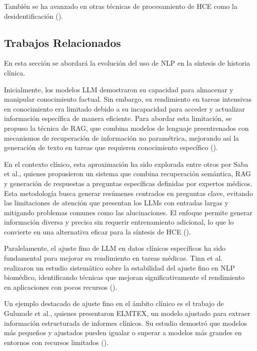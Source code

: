 \documentclass[../main.tex]{subfiles}
\begin{document}
También se ha avanzado en otras técnicas de procesamiento de HCE como la desidentificación (\cite{MORENOBAREA2025109576}).

\subsection{Trabajos Relacionados}

En esta sección se abordará la evolución del uso de NLP en la síntesis de historia clínica.

Inicialmente, los modelos LLM demostraron su capacidad para almacenar y manipular conocimiento factual. Sin embargo, su rendimiento en tareas intensivas en conocimiento era limitado debido a su incapacidad para acceder y actualizar información específica de manera eficiente. Para abordar esta limitación, se propuso la técnica de RAG, que combina modelos de lenguaje preentrenados con mecanismos de recuperación de información no paramétrica, mejorando así la generación de texto en tareas que requieren conocimiento específico (\cite{lewis2021retrievalaugmentedgenerationknowledgeintensivenlp}).

En el contexto clínico, esta aproximación ha sido explorada entre otros por Saba et al., quienes propusieron un sistema que combina recuperación semántica, RAG y generación de respuestas a preguntas específicas definidas por expertos médicos. Esta metodología busca generar resúmenes centrados en preguntas clave, evitando las limitaciones de atención que presentan los LLMs con entradas largas y mitigando problemas comunes como las alucinaciones. El enfoque permite generar información diversa y precisa sin requerir entrenamiento adicional, lo que lo convierte en una alternativa eficaz para la síntesis de HCE (\cite{saba2024questionansweringbasedsummarizationelectronic}).

Paralelamente, el ajuste fino de LLM en datos clínicos específicos ha sido fundamental para mejorar su rendimiento en tareas médicas. Tinn et al. realizaron un estudio sistemático sobre la estabilidad del ajuste fino en NLP biomédico, identificando técnicas que mejoran significativamente el rendimiento en aplicaciones con pocos recursos (\cite{TINN2023100729}).

Un ejemplo destacado de ajuste fino en el ámbito clínico es el trabajo de Guluzade et al., quienes presentaron ELMTEX, un modelo ajustado para extraer información estructurada de informes clínicos. Su estudio demostró que modelos más pequeños y ajustados pueden igualar o superar a modelos más grandes en entornos con recursos limitados (\cite{guluzade2025elmtexfinetuninglargelanguage}).
\end{document}
